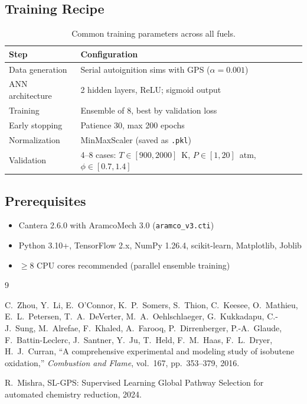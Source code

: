\documentclass[11pt,a4paper]{article}
\begin{document}
\subsection{Training Recipe}

\begin{table}[H]
\centering
\caption{Common training parameters across all fuels.}
\label{tab:recipe}
\begin{tabular}{ll}
\toprule
\textbf{Step} & \textbf{Configuration} \\
\midrule
Data generation & Serial autoignition sims with GPS ($\alpha=0.001$) \\
ANN architecture & 2 hidden layers, ReLU; sigmoid output \\
Training & Ensemble of 8, best by validation loss \\
Early stopping & Patience 30, max 200 epochs \\
Normalization & MinMaxScaler (saved as \texttt{.pkl}) \\
Validation & 4--8 cases: $T \in [900, 2000]$~K, $P \in [1, 20]$~atm, $\phi \in [0.7, 1.4]$ \\
\bottomrule
\end{tabular}
\end{table}

\subsection{Prerequisites}

\begin{itemize}
    \item Cantera 2.6.0 with AramcoMech 3.0 (\texttt{aramco\_v3.cti})
    \item Python 3.10+, TensorFlow 2.x, NumPy 1.26.4, scikit-learn, Matplotlib, Joblib
    \item $\geq$8 CPU cores recommended (parallel ensemble training)
\end{itemize}

\begin{thebibliography}{9}

C.~Zhou, Y.~Li, E.~O'Connor, K.~P.~Somers, S.~Thion, C.~Keesee, O.~Mathieu, E.~L.~Petersen, T.~A.~DeVerter, M.~A.~Oehlschlaeger, G.~Kukkadapu, C.-J.~Sung, M.~Alrefae, F.~Khaled, A.~Farooq, P.~Dirrenberger, P.-A.~Glaude, F.~Battin-Leclerc, J.~Santner, Y.~Ju, T.~Held, F.~M.~Haas, F.~L.~Dryer, H.~J.~Curran,
``A comprehensive experimental and modeling study of isobutene oxidation,''
\emph{Combustion and Flame}, vol.~167, pp.~353--379, 2016.

R.~Mishra, SL-GPS: Supervised Learning Global Pathway Selection for automated chemistry reduction, 2024.

\end{thebibliography}
\end{document}
